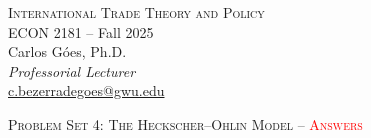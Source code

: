 \documentclass[11pt,letterpaper]{exam}
\begin{document}
\begin{center}
\Large{\textsc{International Trade Theory and Policy}}\\[4pt]
\Large{ECON 2181 \;--\; Fall 2025}\\[6pt]
\large Carlos Góes, Ph.D. \\
\textit{Professorial Lecturer}\\
\href{mailto:c.bezerradegoes@gwu.edu}{c.bezerradegoes@gwu.edu} \\
\end{center}

\bigskip

\begin{center}
\Large{\textsc{Problem Set 4: The Heckscher--Ohlin Model \;--\; \textcolor{red}{Answers}}}
\end{center}
\end{document}
